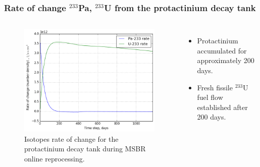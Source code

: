 \begin{frame}
  \frametitle{Rate of change $^{233}$Pa, $^{233}$U from the protactinium decay tank}
    \begin{columns}
    \column[t]{8cm}
   \vspace{-0.35in}
  \begin{figure}[t]
   \includegraphics[height=0.8\textheight]{./images/rates_outflow.png}
   \vspace{-0.12in}
   \caption{Isotopes rate of change for the protactinium decay tank during MSBR online reprocessing.}
    \end{figure}

    \column[t]{4cm}
        \begin{itemize}
        \item Protactinium accumulated for approximately 200 days.
   		\item Fresh fissile $^{233}$U fuel flow established after 200 days.
   	  \end{itemize}
     \end{columns}
\end{frame}


